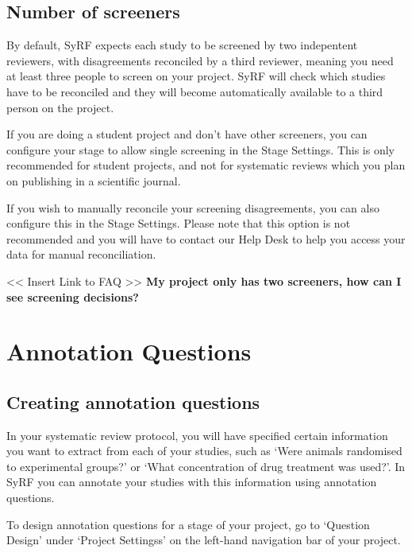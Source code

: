 \documentclass[
]{book}
\begin{document}
\hypertarget{number-of-screeners}{%
\section{Number of screeners}\label{number-of-screeners}}

By default, SyRF expects each study to be screened by two indepentent reviewers, with disagreements reconciled by a third reviewer, meaning you need at least three people to screen on your project. SyRF will check which studies have to be reconciled and they will become automatically available to a third person on the project.

If you are doing a student project and don't have other screeners, you can configure your stage to allow single screening in the Stage Settings. This is only recommended for student projects, and not for systematic reviews which you plan on publishing in a scientific journal.

If you wish to manually reconcile your screening disagreements, you can also configure this in the Stage Settings. Please note that this option is not recommended and you will have to contact our Help Desk to help you access your data for manual reconciliation.

\textless{}\textless{} Insert Link to FAQ \textgreater{}\textgreater{}
\textbf{My project only has two screeners, how can I see screening decisions?}

\hypertarget{projectannotation}{%
\chapter{Annotation Questions}\label{projectannotation}}

\hypertarget{creating-annotation-questions}{%
\section{Creating annotation questions}\label{creating-annotation-questions}}

In your systematic review protocol, you will have specified certain information you want to extract from each of your studies, such as `Were animals randomised to experimental groups?' or `What concentration of drug treatment was used?'. In SyRF you can annotate your studies with this information using annotation questions.

To design annotation questions for a stage of your project, go to `Question Design' under `Project Settingss' on the left-hand navigation bar of your project.
\end{document}
